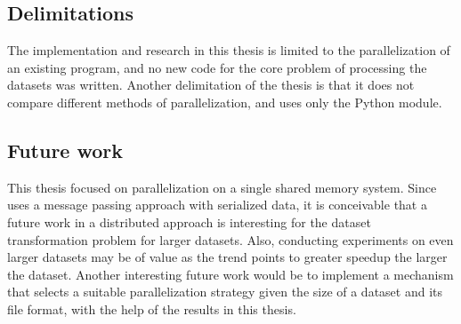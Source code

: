 \subsection{Delimitations}
The implementation and research in this thesis is limited to the parallelization of an existing program, and no new code for the core problem
of processing the datasets was written. Another delimitation of the thesis is that it does not compare different methods of parallelization,
and uses only the Python  module.

\subsection{Future work}
This thesis focused on parallelization on a single shared memory system. Since  uses a message passing approach with serialized data,
it is conceivable that a future work in a distributed approach is interesting for the dataset transformation problem for larger datasets. Also,
conducting experiments on even larger datasets may be of value as the trend points to greater speedup the larger the dataset. Another interesting
future work would be to implement a mechanism that selects a suitable parallelization strategy given the size of a dataset and its file format, with
the help of the results in this thesis.

